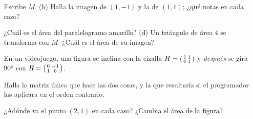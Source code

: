 \documentclass[11pt,a4paper]{article}
\newcommand{\matdos}[4]{\mathchoice{\begin{pmatrix}#1 & #2\\ #3 & #4\end{pmatrix}}{\left(\begin{smallmatrix}#1 & #2\\ #3 & #4\end{smallmatrix}\right)}{\left(\begin{smallmatrix}#1 & #2\\ #3 & #4\end{smallmatrix}\right)}{\left(\begin{smallmatrix}#1 & #2\\ #3 & #4\end{smallmatrix}\right)}}
\newcommand{\transformada}[5]{%
  \begin{scope}
    \clip (-#5,-#5) rectangle (#5,#5);
    \begin{scope}[cm={#1,#3,#2,#4,(0,0)}]
      \draw[zaccent!35,line width=0.5pt] (-6,-6) grid (6,6);
      \fill[zsun!35,opacity=.8] (0,0) rectangle (1,1);
    \end{scope}
  \end{scope}
  \draw[ejes] (-#5-0.2,0) -- (#5+0.3,0); \draw[ejes] (0,-#5-0.2) -- (0,#5+0.3);
  \draw[vec,zcoral] (0,0) -- (#1,#3); \draw[vec,zsky] (0,0) -- (#2,#4);}
\begin{document}
\begin{ejercicios}
  \begin{center}
  \end{center}
  \begin{ejercicios}
  \item Escribe $M$. \quad (b) Halla la imagen de $(1,-1)$ y la de $(1,1)$; ¿qué notas en cada caso?
  \item[(c)] ¿Cuál es el área del paralelogramo amarillo? \quad (d) Un triángulo de área $4$ se transforma con $M$.
    ¿Cuál es el área de su imagen?
  \end{ejercicios}
\item En un videojuego, una figura se inclina con la cizalla $H=\matdos1101$ y \emph{después} se gira \ang{90} con
  $R=\matdos0{-1}10$.
  \begin{ejercicios}
  \item Halla la matriz única que hace las dos cosas, y la que resultaría si el programador las aplicara en el orden contrario.
  \item ¿Adónde va el punto $(2,1)$ en cada caso? ¿Cambia el área de la figura?
  \end{ejercicios}
\end{ejercicios}
\end{document}
